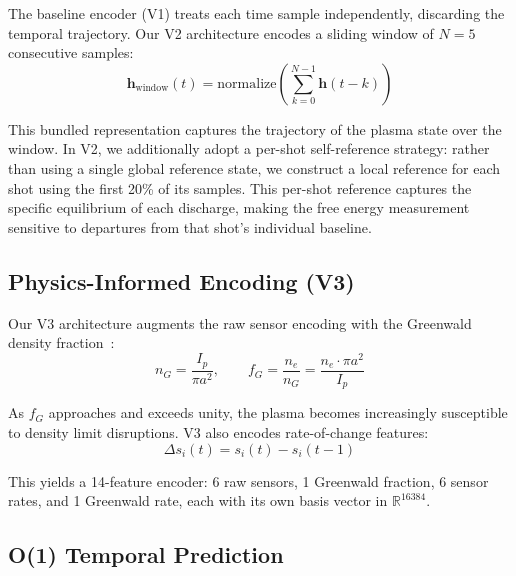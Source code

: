 \documentclass[twocolumn,prl,aps,superscriptaddress,floatfix]{revtex4-2}
\begin{document}
The baseline encoder (V1) treats each time sample independently, discarding the temporal trajectory. Our V2 architecture encodes a sliding window of $N = 5$ consecutive samples:
\begin{equation}
\mathbf{h}_{\mathrm{window}}(t) = \mathrm{normalize}\left(\sum_{k=0}^{N-1} \mathbf{h}(t - k)\right)
\label{eq:window}
\end{equation}

This bundled representation captures the trajectory of the plasma state over the window. In V2, we additionally adopt a per-shot self-reference strategy: rather than using a single global reference state, we construct a local reference for each shot using the first 20\% of its samples. This per-shot reference captures the specific equilibrium of each discharge, making the free energy measurement sensitive to departures from that shot's individual baseline.

\subsection{Physics-Informed Encoding (V3)}

Our V3 architecture augments the raw sensor encoding with the Greenwald density fraction~\cite{Greenwald2002}:
\begin{equation}
n_G = \frac{I_p}{\pi a^2}, \qquad f_G = \frac{n_e}{n_G} = \frac{n_e \cdot \pi a^2}{I_p}
\label{eq:greenwald}
\end{equation}

As $f_G$ approaches and exceeds unity, the plasma becomes increasingly susceptible to density limit disruptions. V3 also encodes rate-of-change features:
\begin{equation}
\Delta s_i(t) = s_i(t) - s_i(t-1)
\label{eq:rate}
\end{equation}

This yields a 14-feature encoder: 6 raw sensors, 1 Greenwald fraction, 6 sensor rates, and 1 Greenwald rate, each with its own basis vector in $\mathbb{R}^{16384}$.

\subsection{O(1) Temporal Prediction}
\end{document}
